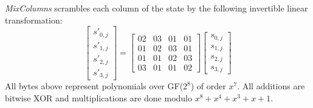 \documentclass[thesis=B,english]{FITthesis}[2019/03/06]
\begin{document}
\textit{MixColumns} scrambles each column of the state by the following invertible linear transformation:
$$
\begin{bmatrix}
	s'_{0,j} \\ s'_{1,j} \\ s'_{2,j} \\ s'_{3,j}
\end{bmatrix} = \begin{bmatrix}
	02 & 03 & 01 & 01 \\
	01 & 02 & 03 & 01 \\
	01 & 01 & 02 & 03 \\
	03 & 01 & 01 & 02
\end{bmatrix} \begin{bmatrix}
	s_{0,j} \\ s_{1,j} \\ s_{2,j} \\ s_{3,j}
\end{bmatrix}
$$
All bytes above represent polynomials over GF($2^8$) of order $x^7$. All additions are bitwise XOR and multiplications are done modulo $x^8+x^4+x^3+x+1$.
\end{document}
